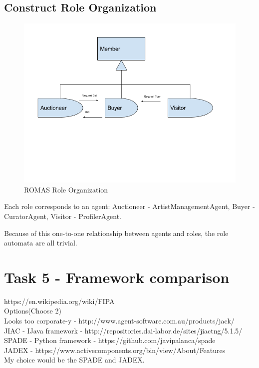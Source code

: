 \documentclass[a4paper, 11pt]{article}
\begin{document}
\subsection{Construct Role Organization}
\begin{figure}[H]
	\caption{ROMAS Role Organization}
	\centering
	\includegraphics[width=\textwidth]{./images/ROMASroleorganization.png}
\end{figure}

Each role corresponds to an agent: Auctioneer - ArtistManagementAgent, Buyer - CuratorAgent,
Visitor - ProfilerAgent.

Because of this one-to-one relationship between agents and roles, the role automata are all
trivial.

\section{Task 5 - Framework comparison}

https://en.wikipedia.org/wiki/FIPA \\
Options(Choose 2) \\
Looks too corporate-y - http://www.agent-software.com.au/products/jack/ \\
JIAC - IJava framework - http://repositories.dai-labor.de/sites/jiactng/5.1.5/ \\
SPADE - Python framework - https://github.com/javipalanca/spade \\
JADEX - https://www.activecomponents.org/bin/view/About/Features \\

My choice would be the SPADE and JADEX. \\
\end{document}
